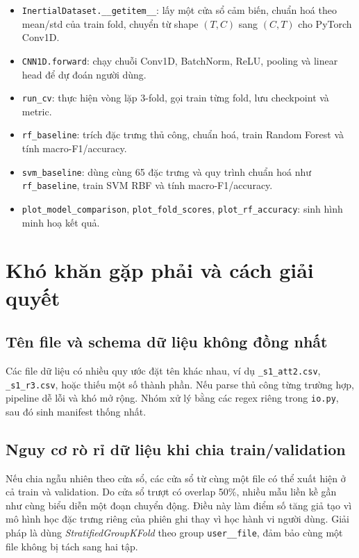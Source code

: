 \documentclass[12pt,a4paper]{article}
\begin{document}
\begin{itemize}
    \item \texttt{InertialDataset.\_\_getitem\_\_}: lấy một cửa sổ cảm biến, chuẩn hoá theo mean/std của train fold, chuyển từ shape \((T, C)\) sang \((C, T)\) cho PyTorch Conv1D.
    \item \texttt{CNN1D.forward}: chạy chuỗi Conv1D, BatchNorm, ReLU, pooling và linear head để dự đoán người dùng.
    \item \texttt{run\_cv}: thực hiện vòng lặp 3-fold, gọi train từng fold, lưu checkpoint và metric.
    \item \texttt{rf\_baseline}: trích đặc trưng thủ công, chuẩn hoá, train Random Forest và tính macro-F1/accuracy.
    \item \texttt{svm\_baseline}: dùng cùng 65 đặc trưng và quy trình chuẩn hoá như \texttt{rf\_baseline}, train SVM RBF và tính macro-F1/accuracy.
    \item \texttt{plot\_model\_comparison}, \texttt{plot\_fold\_scores}, \texttt{plot\_rf\_accuracy}: sinh hình minh hoạ kết quả.
\end{itemize}

\section{Khó khăn gặp phải và cách giải quyết}

\subsection{Tên file và schema dữ liệu không đồng nhất}

Các file dữ liệu có nhiều quy ước đặt tên khác nhau, ví dụ \texttt{\_s1\_att2.csv}, \texttt{\_s1\_r3.csv}, hoặc thiếu một số thành phần. Nếu parse thủ công từng trường hợp, pipeline dễ lỗi và khó mở rộng. Nhóm xử lý bằng các regex riêng trong \texttt{io.py}, sau đó sinh manifest thống nhất.

\subsection{Nguy cơ rò rỉ dữ liệu khi chia train/validation}

Nếu chia ngẫu nhiên theo cửa sổ, các cửa sổ từ cùng một file có thể xuất hiện ở cả train và validation. Do cửa sổ trượt có overlap 50\%, nhiều mẫu liền kề gần như cùng biểu diễn một đoạn chuyển động. Điều này làm điểm số tăng giả tạo vì mô hình học đặc trưng riêng của phiên ghi thay vì học hành vi người dùng. Giải pháp là dùng \textit{StratifiedGroupKFold} theo group \texttt{user\_\_file}, đảm bảo cùng một file không bị tách sang hai tập.
\end{document}
